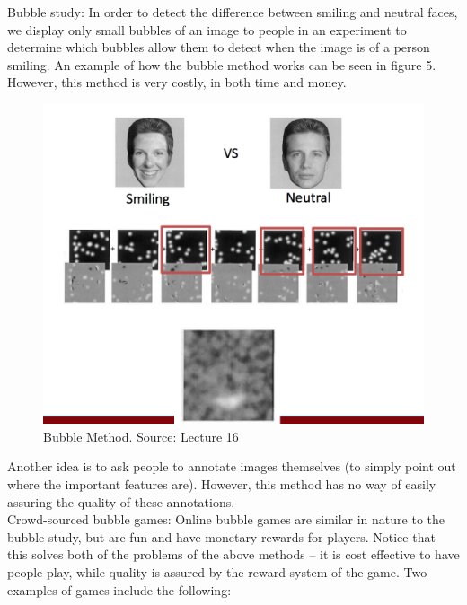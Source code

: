 \documentclass[11pt]{article}
\begin{document}
Bubble study: In order to detect the difference between smiling and neutral faces, we display only small bubbles of an image to people in an experiment to determine which bubbles allow them to detect when the image is of a person smiling. An example of how the bubble method works can be seen in figure 5. However, this method is very costly, in both time and money. \\
\begin{figure}[h]
  \centering
  \includegraphics[scale=0.6]{bubblestudy.png}
  \caption{Bubble Method. Source: Lecture 16}
\end{figure}
Another idea is to ask people to annotate images themselves (to simply point out where the important features are). However, this method has no way of easily assuring the quality of these annotations. \\
Crowd-sourced bubble games: Online bubble games are similar in nature to the bubble study, but are fun and have monetary rewards for players. Notice that this solves both of the problems of the above methods -- it is cost effective to have people play, while quality is assured by the reward system of the game. Two examples of games include the following:
\end{document}
